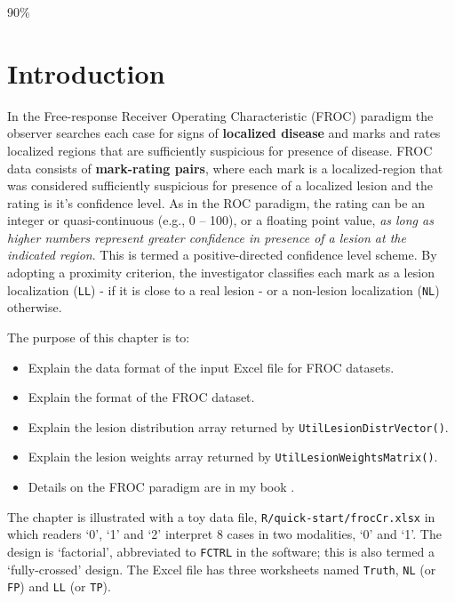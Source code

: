 \documentclass[
]{book}
\providecommand{\tightlist}{%
  \setlength{\itemsep}{0pt}\setlength{\parskip}{0pt}}
\begin{document}
90\%

\hypertarget{quick-start-froc-data-intro}{%
\section{Introduction}\label{quick-start-froc-data-intro}}

In the Free-response Receiver Operating Characteristic (FROC) paradigm the observer searches each case for signs of \textbf{localized disease} and marks and rates localized regions that are sufficiently suspicious for presence of disease. FROC data consists of \textbf{mark-rating pairs}, where each mark is a localized-region that was considered sufficiently suspicious for presence of a localized lesion and the rating is it's confidence level. As in the ROC paradigm, the rating can be an integer or quasi-continuous (e.g., 0 -- 100), or a floating point value, \emph{as long as higher numbers represent greater confidence in presence of a lesion at the indicated region}. This is termed a positive-directed confidence level scheme. By adopting a proximity criterion, the investigator classifies each mark as a lesion localization (\texttt{LL}) - if it is close to a real lesion - or a non-lesion localization (\texttt{NL}) otherwise.

The purpose of this chapter is to:

\begin{itemize}
\tightlist
\item
  Explain the data format of the input Excel file for FROC datasets.
\item
  Explain the format of the FROC dataset.
\item
  Explain the lesion distribution array returned by \texttt{UtilLesionDistrVector()}.
\item
  Explain the lesion weights array returned by \texttt{UtilLesionWeightsMatrix()}.
\item
  Details on the FROC paradigm are in my book \citep{chakraborty2017observer}.
\end{itemize}

The chapter is illustrated with a toy data file, \texttt{R/quick-start/frocCr.xlsx} in which readers `0', `1' and `2' interpret 8 cases in two modalities, `0' and `1'. The design is `factorial', abbreviated to \texttt{FCTRL} in the software; this is also termed a `fully-crossed' design. The Excel file has three worksheets named \texttt{Truth}, \texttt{NL} (or \texttt{FP}) and \texttt{LL} (or \texttt{TP}).
\end{document}
